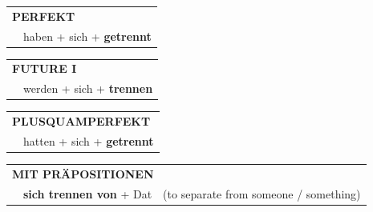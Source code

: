 \documentclass[10pt,a4paper]{revtex4-2}
\begin{document}
\begin{verbbox-acc}
 \begin{tabular}{rl}
     \multicolumn{2}{l}{\textbf{PERFEKT}}\\
    &haben + sich + \textbf{getrennt}\\
  \end{tabular}
\hfill
   \begin{tabular}{rl}
   
    \multicolumn{2}{l}{\textbf{FUTURE I} }\\
    &werden + sich + \textbf{trennen}\\
 
  \end{tabular}
\hfill
   \begin{tabular}{rl}
      \multicolumn{2}{l}{\textbf{PLUSQUAMPERFEKT}}\\
    &hatten + sich + \textbf{getrennt}\\
  \end{tabular}
  
\vspace{10pt}

   \begin{tabular}{lll}
      \multicolumn{3}{l}{\textbf{MIT PRÄPOSITIONEN}}\\
& \textbf{sich trennen von} + Dat & (to separate from someone / something)
  \end{tabular}
  
  \vspace{-5pt}

\end{verbbox-acc}
\end{document}
